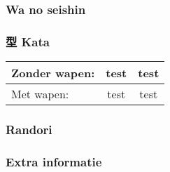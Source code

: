 \subsubsection{Wa no seishin}

\subsubsection{型 Kata}
\begin{table}[H]
\begin{center}
\begin{tabular}{lcc}
    Zonder wapen: & test & test \\
    \hline
    Met wapen: & test & test
\end{tabular}
\end{center}
\label{kata_dan_2}
\end{table}

\subsubsection{Randori}

\subsubsection{Extra informatie}
